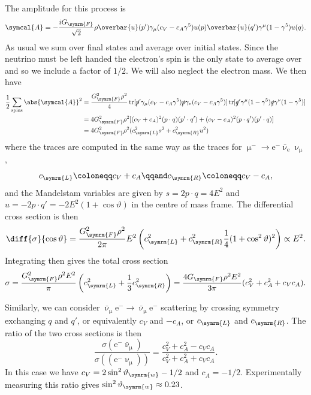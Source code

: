 \documentclass[fleqn]{NotesClass}
\newcommand{\Pparticle}[1]{\mathrm{#1}}
\newcommand{\Pe}{\ensuremath{\Pparticle{e}^{-}}}
\newcommand{\Pmu}{\ensuremath{\upmu^{-}}}
\newcommand{\Pnumu}{\ensuremath{\upnu_{\upmu}}}
\newcommand{\APantiparticle}[1]{\bar{#1}}
\newcommand{\APnue}{\ensuremath{\APantiparticle{\upnu}_{\mathrm{e}}}}
\newcommand{\APnumu}{\ensuremath{\APantiparticle{\upnu}_{\text{μ}}}}
\newcommand{\diracadjoint}[1]{\overbar{#1}}
\newcommand{\amplitude}{\symcal{A}}
\DeclareMathOperator{\tr}{tr}
\newcommand{\Left}{\symrm{L}}
\newcommand{\Right}{\symrm{R}}
\newcommand{\fermiConst}{G_{\symrm{F}}}
\newcommand{\weinbergangle}{\vartheta_{\symrm{w}}}
\begin{document}
    The amplitude for this process is
    \begin{equation}
        \amplitude = -\frac{i\fermiConst}{\sqrt{2}} \rho \diracadjoint{u}(p') \gamma_\mu (c_V - c_A \gamma^5) u(p) \diracadjoint{u}(q')\gamma^\mu (1 - \gamma^5) u(q).
    \end{equation}
    As usual we sum over final states and average over initial states.
    Since the neutrino must be left handed the electron's spin is the only state to average over and so we include a factor of \(1/2\).
    We will also neglect the electron mass.
    We then have
    \begin{align}
        \frac{1}{2}\sum_{\text{spins}} \abs{\amplitude}^2 &= \frac{\fermiConst^2\rho^2}{4} \tr[\slashed{p}'\gamma_\mu(c_V - c_A\gamma^5) \slashed{p}\gamma_\nu(c_V - c_A\gamma^5)] \tr[\slashed{q}'\gamma^\mu(1 - \gamma^5)\slashed{q}\gamma^\nu(1 - \gamma^5)]\\
        &= 4\fermiConst^2\rho^2[(c_V + c_A)^2(p \cdot q)(p' \cdot q') + (c_V - c_A)^2(p \cdot q')(p'\cdot q)]\\
        &= 4\fermiConst^2\rho^2(c_{\Left}^2s^2 + c_{\Right}^2u^2)
    \end{align}
    where the traces are computed in the same way as the traces for \(\Pmu \to \Pe\APnue\Pnumu\),
    \begin{equation}
        c_{\Left} \coloneqq c_V + c_A \qqand c_{\Right} \coloneqq c_V - c_A,
    \end{equation}
    and the Mandelstam variables are given by \(s = 2p\cdot q = 4E^2\) and \(u = -2p\cdot q' = -2E^2(1 + \cos\vartheta)\) in the centre of mass frame.
    The differential cross section is then
    \begin{equation}
        \diff{\sigma}{\cos\vartheta} = \frac{\fermiConst^2 \rho^2}{2\pi} E^2\left( c_{\Left}^2 + c_{\Right}^2 \frac{1}{4}(1 + \cos^2\vartheta)^2 \right) \propto E^2.
    \end{equation}
    Integrating then gives the total cross section
    \begin{equation}
        \sigma = \frac{\fermiConst^2 \rho^2 E^2}{\pi} \left( c_{\Left}^2 + \frac{1}{3}c_{\Right}^2 \right) = \frac{4\fermiConst\rho^2E^2}{3\pi}(c_V^2 + c_A^2 + c_Vc_A).
    \end{equation}
    
    Similarly, we can consider \(\APnumu \Pe \to \APnumu \Pe\) scattering by crossing symmetry exchanging \(q\) and \(q'\), or equivalently \(c_V\) and \(-c_A\), or \(c_{\Left}\) and \(c_{\Right}\).
    The ratio of the two cross sections is then
    \begin{equation}
        \frac{\sigma(\Pe\APnumu)}{\sigma((\Pe\Pnumu))} = \frac{c_V^2 + c_A^2 - c_Vc_A}{c_V^2 + c_A^2 + c_Vc_A}.
    \end{equation}
    In this case we have \(c_V = 2\sin^2\weinbergangle - 1/2\) and \(c_A = -1/2\).
    Experimentally measuring this ratio gives \(\sin^2\weinbergangle \approx 0.23\).
    
\end{document}

